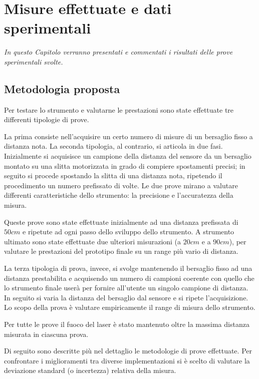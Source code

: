 \chapter{Misure effettuate e dati sperimentali}
\label{capitolo5}
\thispagestyle{empty}

\textit{In questo Capitolo verranno presentati e commentati i risultati delle prove sperimentali svolte.}

\section{Metodologia proposta}
Per testare lo strumento e valutarne le prestazioni sono state effettuate tre differenti tipologie di prove.

La prima consiste nell'acquisire un certo numero di misure di un bersaglio fisso a distanza nota. La seconda tipologia, al contrario, si articola in due fasi. Inizialmente si acquisisce un campione della distanza del sensore da un bersaglio montato su una slitta motorizzata in grado di compiere spostamenti precisi; in seguito si procede spostando la slitta di una distanza nota, ripetendo il procedimento un numero prefissato di volte. Le due prove mirano a valutare differenti caratteristiche dello strumento: la precisione e l'accuratezza della misura.

Queste prove sono state effettuate inizialmente ad una distanza prefissata di $50cm$ e ripetute ad ogni passo dello sviluppo dello strumento. A strumento ultimato sono state effettuate due ulteriori misurazioni (a $20cm$ e a $90cm$), per valutare le prestazioni del prototipo finale su un range più vario di distanza.

La terza tipologia di prova, invece, si svolge mantenendo il bersaglio fisso ad una distanza prestabilita e acquisendo un numero di campioni coerente con quello che lo strumento finale userà per fornire all'utente un singolo campione di distanza. In seguito si varia la distanza del bersaglio dal sensore e si ripete l'acquisizione. Lo scopo della prova è valutare empiricamente il range di misura dello strumento.

Per tutte le prove il fuoco del laser è stato mantenuto oltre la massima distanza misurata in ciascuna prova.

Di seguito sono descritte più nel dettaglio le metodologie di prove effettuate. Per confrontare i miglioramenti tra diverse implementazioni si è scelto di valutare la deviazione standard  (o incertezza) relativa della misura.

